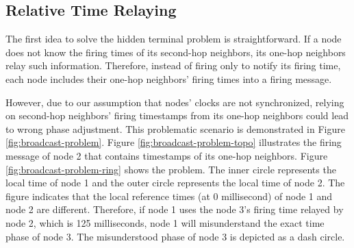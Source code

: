 \subsection{Relative Time Relaying}
\label{sec:relative}
The first idea to solve the hidden terminal problem is straightforward. If a node does not know the firing times of its second-hop neighbors, its one-hop neighbors relay such information. Therefore, instead of firing only to notify its firing time, each node includes their one-hop neighbors' firing times into a firing message. 

However, due to our assumption that nodes' clocks are not synchronized, relying on second-hop neighbors' firing timestamps from its one-hop neighbors could lead to wrong phase adjustment. This problematic scenario is demonstrated in Figure \ref{fig:broadcast-problem}. Figure \ref{fig:broadcast-problem-topo} illustrates the firing message of node 2 that contains timestamps of its one-hop neighbors. Figure \ref{fig:broadcast-problem-ring} shows the problem. The inner circle represents the local time of node 1 and the outer circle represents the local time of node 2. The figure indicates that the local reference times (at 0 millisecond) of node 1 and node 2 are different. Therefore, if node 1 uses the node 3's firing time relayed by node 2, which is 125 milliseconds, node 1 will misunderstand the exact time phase of node 3. The misunderstood phase of node 3 is depicted as a dash circle. 

